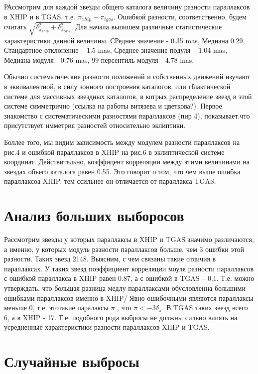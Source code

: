 \documentclass[14pt]{article} %
\begin{document}
РАссмотрим для каждой звезды общего каталога величину разности параллаксов в XHIP и в TGAS, т.е. $\pi_{xhip} - \pi_{tgas}$. Ошибкой разности, соответственно, будем считать $\sqrt{\delta^2_{\pi_{xhip}} + \delta^2_{\pi_{tgas}}}$. Для начала выпишем различные статистические характеристики данной величины. СРеднее значение - 0.35 mas, Медиана 0.29, Стандартное отклонение -- 1.5 mas, Среднее значение подуля -- 1.04 mas, Медиана модуля - 0.76 mas, 99 персентиль модуля - 4.78 mas. 

Обычно систематические разности положений и собственных движений изучают в эквивалентной, в силу зонного построения каталогов, или гfлактической системе для массивных звездных каталогов, в котрых распределение звезд в этой системе симметрично (ссылка на работы витязева и цветкова?). Первое знакомство с систематическими разностями параллаксов (пир 4), показывает.что присутствует имметрия разностей относительно эклиптики.

Боллее того, мы видим зависимость между модулем разности параллаксов на рис.4 и ошибкой параллаксов в XHIP на рис.6  в эклиптической системе координат. Действительно, коэффицент корреляции между этими величинами на звездах объего каталога равен 0.55. Это говорит о том, что чем выше ошибка параллаксоа XHIP, тем ссильнее он отличается от параллакса TGAS.

\section{Анализ больших выборосов}\label{errvid}
Рассмотрим звезды у которых параллаксы в XHIP и TGAS  значимо различаются, а именно, у которых модуль разности параллаксов больше, чем 3 ошибки этой разности. Таких звезд 2148. Выясним, с чем связаны такие отличия в параллаксах. У таких звезд поэффициент корреляции моуля разности параллаксов с ошибкой параллакса в XHIP равен 0.87, а с ошибкой в TGAS -- 0.1. Т.е. можно утверждать. что большая разница медлу параллаксами обусловленна большими ошибками параллаксов именно в XHIP/ Явно ошибочными являются параллаксы меньше 0, т.е. этотакие паралаксы $\pi$ , что $\pi < -3\delta_{\pi}$. В TGAS таких звезд всего 6, а в XHIP - 17. Т.е. подобного рода выбросы не должны сильно влиять на усредненные характеристики разности параллаксов XHIP и TGAS.



\section{Случайные выбросы}\label{errvid}
\end{document}
